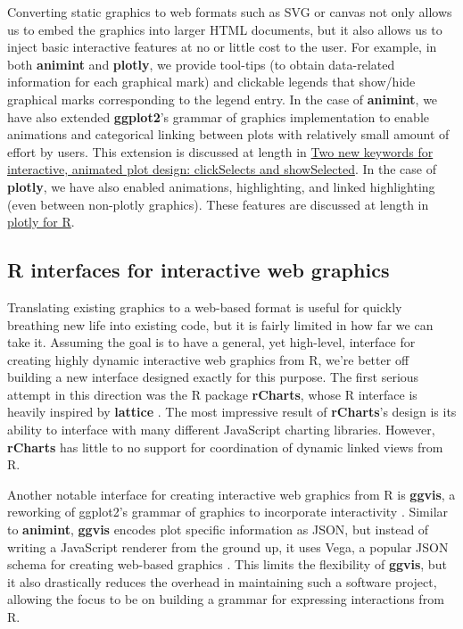 \documentclass[11pt]{isuthesis}
\begin{document}
Converting static graphics to web formats such as SVG or canvas not only
allows us to embed the graphics into larger HTML documents, but it also
allows us to inject basic interactive features at no or little cost to
the user. For example, in both \textbf{animint} and \textbf{plotly}, we
provide tool-tips (to obtain data-related information for each graphical
mark) and clickable legends that show/hide graphical marks corresponding
to the legend entry. In the case of \textbf{animint}, we have also
extended \textbf{ggplot2}'s grammar of graphics implementation to enable
animations and categorical linking between plots with relatively small
amount of effort by users. This extension is discussed at length in
\protect\hyperlink{two-new-keywords-for-interactive-animated-plot-design-clickSelects-and-showSelected}{Two
new keywords for interactive, animated plot design: clickSelects and
showSelected}. In the case of \textbf{plotly}, we have also enabled
animations, highlighting, and linked highlighting (even between
non-plotly graphics). These features are discussed at length in
\href{https://cpsievert.github.io/plotly_book/}{plotly for R}.

\subsection{R interfaces for interactive web
graphics}\label{r-interfaces-for-interactive-web-graphics}

Translating existing graphics to a web-based format is useful for
quickly breathing new life into existing code, but it is fairly limited
in how far we can take it. Assuming the goal is to have a general, yet
high-level, interface for creating highly dynamic interactive web
graphics from R, we're better off building a new interface designed
exactly for this purpose. The first serious attempt in this direction
was the R package \textbf{rCharts}, whose R interface is heavily
inspired by \textbf{lattice} \citep{rCharts}. The most impressive result
of \textbf{rCharts}'s design is its ability to interface with many
different JavaScript charting libraries. However, \textbf{rCharts} has
little to no support for coordination of dynamic linked views from R.

Another notable interface for creating interactive web graphics from R
is \textbf{ggvis}, a reworking of ggplot2's grammar of graphics to
incorporate interactivity \citep{ggvis}. Similar to \textbf{animint},
\textbf{ggvis} encodes plot specific information as JSON, but instead of
writing a JavaScript renderer from the ground up, it uses Vega, a
popular JSON schema for creating web-based graphics \citep{vega}. This
limits the flexibility of \textbf{ggvis}, but it also drastically
reduces the overhead in maintaining such a software project, allowing
the focus to be on building a grammar for expressing interactions from
R.
\end{document}
